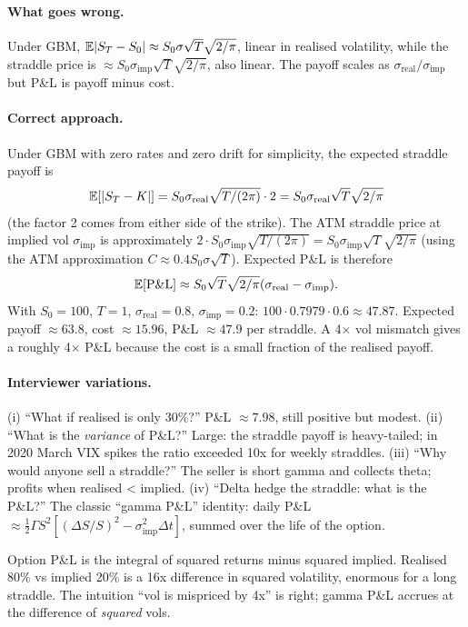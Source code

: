 \paragraph{What goes wrong.}
Under GBM, $\mathbb{E}|S_T - S_0| \approx S_0 \sigma \sqrt{T} \sqrt{2/\pi}$,
linear in realised volatility, while the straddle price is
$\approx S_0 \sigma_{\mathrm{imp}} \sqrt{T} \sqrt{2/\pi}$, also
linear.  The payoff scales as $\sigma_{\mathrm{real}}/
\sigma_{\mathrm{imp}}$ but P\&L is payoff minus cost.

\paragraph{Correct approach.}
Under GBM with zero rates and zero drift for simplicity, the
expected straddle payoff is
\[
\mathbb{E}[|S_T - K|]
= S_0 \sigma_{\mathrm{real}} \sqrt{T/(2\pi)} \cdot 2
= S_0 \sigma_{\mathrm{real}} \sqrt{T} \sqrt{2/\pi}
\]
(the factor 2 comes from either side of the strike).  The ATM
straddle price at implied vol $\sigma_{\mathrm{imp}}$ is
approximately $2 \cdot S_0 \sigma_{\mathrm{imp}} \sqrt{T/(2\pi)}
= S_0 \sigma_{\mathrm{imp}} \sqrt{T} \sqrt{2/\pi}$ (using the
ATM approximation $C \approx 0.4 S_0 \sigma \sqrt{T}$).
Expected P\&L is therefore
\[
\mathbb{E}[\mathrm{P\&L}] \approx S_0 \sqrt{T} \sqrt{2/\pi}
(\sigma_{\mathrm{real}} - \sigma_{\mathrm{imp}}).
\]
With $S_0 = 100$, $T = 1$, $\sigma_{\mathrm{real}} = 0.8$,
$\sigma_{\mathrm{imp}} = 0.2$:
$100 \cdot 0.7979 \cdot 0.6 \approx 47.87$.  Expected payoff
$\approx 63.8$, cost $\approx 15.96$, P\&L $\approx 47.9$ per
straddle.  A 4$\times$ vol mismatch gives a roughly 4$\times$
P\&L because the cost is a small fraction of the realised payoff.

\paragraph{Interviewer variations.}
(i) ``What if realised is only 30\%?''  P\&L $\approx 7.98$, still
positive but modest.  (ii) ``What is the \emph{variance} of P\&L?''
Large: the straddle payoff is heavy-tailed; in 2020 March VIX
spikes the ratio exceeded 10x for weekly straddles.  (iii) ``Why
would anyone sell a straddle?''  The seller is short gamma and
collects theta; profits when realised < implied.  (iv) ``Delta
hedge the straddle: what is the P\&L?''  The classic ``gamma
P\&L'' identity: daily P\&L $\approx \tfrac{1}{2} \Gamma S^2
[(\Delta S/S)^2 - \sigma_{\mathrm{imp}}^2 \Delta t]$, summed over
the life of the option.

\begin{intuitionbox}
Option P\&L is the integral of squared returns minus squared
implied.  Realised 80\% vs implied 20\% is a 16x difference in
squared volatility, enormous for a long straddle.  The
intuition ``vol is mispriced by 4x'' is right; gamma P\&L accrues
at the difference of \emph{squared} vols.
\end{intuitionbox}

